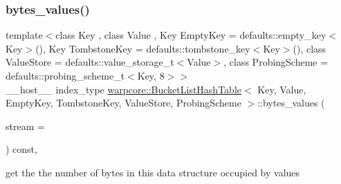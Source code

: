\subsubsection{\texorpdfstring{bytes\+\_\+values()}{bytes\_values()}}
{\footnotesize\ttfamily template$<$class Key , class Value , Key Empty\+Key = defaults\+::empty\+\_\+key$<$\+Key$>$(), Key Tombstone\+Key = defaults\+::tombstone\+\_\+key$<$\+Key$>$(), class Value\+Store  = defaults\+::value\+\_\+storage\+\_\+t$<$\+Value$>$, class Probing\+Scheme  = defaults\+::probing\+\_\+scheme\+\_\+t$<$\+Key, 8$>$$>$ \\
\+\_\+\+\_\+host\+\_\+\+\_\+ index\+\_\+type \hyperlink{classwarpcore_1_1BucketListHashTable}{warpcore\+::\+Bucket\+List\+Hash\+Table}$<$ Key, Value, Empty\+Key, Tombstone\+Key, Value\+Store, Probing\+Scheme $>$\+::bytes\+\_\+values (\begin{DoxyParamCaption}\item[{const cuda\+Stream\+\_\+t}]{stream = {} }\end{DoxyParamCaption}) const\hspace{0.3cm}{\ttfamily [inline]}, {\ttfamily [noexcept]}}



get the the number of bytes in this data structure occupied by values 


